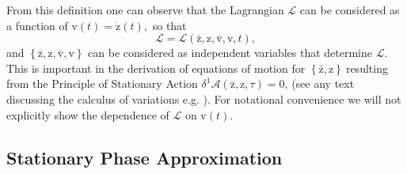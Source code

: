 \documentclass[aps,preprint]{revtex4}%
\begin{document}
From this definition one can observe that the Lagrangian $\mathcal{L}$ can be
considered as a function of $\mathrm{v}\left(  t\right)  =\mathrm{\dot{z}%
}\left(  t\right)  \mathrm{,}$ so that
\begin{equation}
\mathcal{L=L}\left(  \mathrm{\bar{z}},\mathrm{z}\mathbf{,}\mathrm{\bar{v}%
},\mathrm{v}\mathbf{,}t\right)  ,
\end{equation}
and $\left\{  \mathrm{\bar{z}},\mathrm{z}\mathbf{,}\mathrm{\bar{v}}%
,\mathrm{v}\right\}  $ can be considered as independent variables that
determine $\mathcal{L}$. This is important in the derivation of equations of
motion for $\left\{  \mathrm{\bar{z}},\mathrm{z}\right\}  \mathrm{\ }%
$resulting from the Principle of Stationary Action $\delta^{1}\mathcal{A}%
\left(  \mathrm{\bar{z}},\mathrm{z}\mathbf{,}\tau\right)  =0$, (see any text
discussing the calculus of variations e.g. \cite{sagan}). For notational
convenience we will not explicitly show the dependence of $\mathcal{L}$ on
$\mathrm{v}\left(  t\right)  $.

\subsection{Stationary Phase Approximation \label{SPA}}
\end{document}
